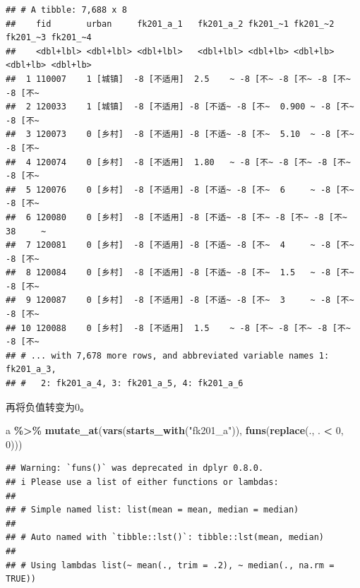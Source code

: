 \documentclass[
]{book}
\newenvironment{Shaded}{\begin{snugshade}}{\end{snugshade}}
\newcommand{\DecValTok}[1]{\textcolor[rgb]{0.00,0.00,0.81}{#1}}
\newcommand{\FunctionTok}[1]{\textcolor[rgb]{0.13,0.29,0.53}{\textbf{#1}}}
\newcommand{\NormalTok}[1]{#1}
\newcommand{\SpecialCharTok}[1]{\textcolor[rgb]{0.81,0.36,0.00}{\textbf{#1}}}
\newcommand{\StringTok}[1]{\textcolor[rgb]{0.31,0.60,0.02}{#1}}
\begin{document}
\begin{verbatim}
## # A tibble: 7,688 x 8
##    fid       urban     fk201_a_1   fk201_a_2 fk201_~1 fk201_~2 fk201_~3 fk201_~4
##    <dbl+lbl> <dbl+lbl> <dbl+lbl>   <dbl+lbl> <dbl+lb> <dbl+lb> <dbl+lb> <dbl+lb>
##  1 110007    1 [城镇]  -8 [不适用]  2.5    ~ -8 [不~ -8 [不~ -8 [不~ -8 [不~
##  2 120033    1 [城镇]  -8 [不适用] -8 [不适~ -8 [不~  0.900 ~ -8 [不~ -8 [不~
##  3 120073    0 [乡村]  -8 [不适用] -8 [不适~ -8 [不~  5.10  ~ -8 [不~ -8 [不~
##  4 120074    0 [乡村]  -8 [不适用]  1.80   ~ -8 [不~ -8 [不~ -8 [不~ -8 [不~
##  5 120076    0 [乡村]  -8 [不适用] -8 [不适~ -8 [不~  6     ~ -8 [不~ -8 [不~
##  6 120080    0 [乡村]  -8 [不适用] -8 [不适~ -8 [不~ -8 [不~ -8 [不~ 38     ~
##  7 120081    0 [乡村]  -8 [不适用] -8 [不适~ -8 [不~  4     ~ -8 [不~ -8 [不~
##  8 120084    0 [乡村]  -8 [不适用] -8 [不适~ -8 [不~  1.5   ~ -8 [不~ -8 [不~
##  9 120087    0 [乡村]  -8 [不适用] -8 [不适~ -8 [不~  3     ~ -8 [不~ -8 [不~
## 10 120088    0 [乡村]  -8 [不适用]  1.5    ~ -8 [不~ -8 [不~ -8 [不~ -8 [不~
## # ... with 7,678 more rows, and abbreviated variable names 1: fk201_a_3,
## #   2: fk201_a_4, 3: fk201_a_5, 4: fk201_a_6
\end{verbatim}

再将负值转变为0。

\begin{Shaded}
\begin{Highlighting}[]
\NormalTok{a }\SpecialCharTok{\%\textgreater{}\%} \FunctionTok{mutate\_at}\NormalTok{(}\FunctionTok{vars}\NormalTok{(}\FunctionTok{starts\_with}\NormalTok{(}\StringTok{"fk201\_a"}\NormalTok{)), }\FunctionTok{funs}\NormalTok{(}\FunctionTok{replace}\NormalTok{(., . }\SpecialCharTok{\textless{}} \DecValTok{0}\NormalTok{, }\DecValTok{0}\NormalTok{)))}
\end{Highlighting}
\end{Shaded}

\begin{verbatim}
## Warning: `funs()` was deprecated in dplyr 0.8.0.
## i Please use a list of either functions or lambdas:
## 
## # Simple named list: list(mean = mean, median = median)
## 
## # Auto named with `tibble::lst()`: tibble::lst(mean, median)
## 
## # Using lambdas list(~ mean(., trim = .2), ~ median(., na.rm = TRUE))
\end{verbatim}
\end{document}
